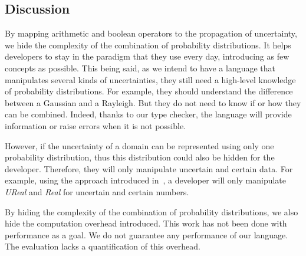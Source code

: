 \subsection{Discussion}

By mapping arithmetic and boolean operators to the propagation of uncertainty, we hide the complexity of the combination of probability distributions.
It helps developers to stay in the paradigm that they use every day, introducing as few concepts as possible.
This being said, as we intend to have a language that manipulates several kinds of uncertainties, they still need a high-level knowledge of probability distributions.
For example, they should understand the difference between a Gaussian and a Rayleigh.
But they do not need to know if or how they can be combined.
Indeed, thanks to our type checker, the language will provide information or raise errors when it is not possible.

However, if the uncertainty of a domain can be represented using only one probability distribution, thus this distribution could also be hidden for the developer.
Therefore, they will only manipulate uncertain and certain data.
For example, using the approach introduced in~\cite{DBLP:conf/sle/MayerhoferWV16}, a developer will only manipulate \textit{UReal} and \textit{Real} for uncertain and certain numbers.

By hiding the complexity of the combination of probability distributions, we also hide the computation overhead introduced.
This work has not been done with performance as a goal.
We do not guarantee any performance of our language.
The evaluation lacks a quantification of this overhead.